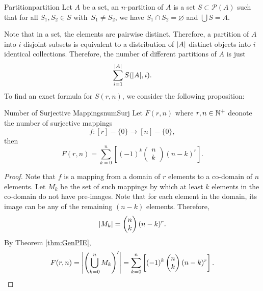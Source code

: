 \documentclass[math]{amznotes}
\theoremstyle{remark}
\begin{document}
\begin{dfnbox}{Partition}{partition}
    Let $A$ be a set, an $n$-partition of $A$ is a set $S \subset \mathcal{P}(A)$ such that for all $S_1, S_2 \in S$ with~$S_1 \neq S_2$, we have $S_1 \cap S_2 = \varnothing$ and $\bigcup S = A$.
\end{dfnbox}
Note that in a set, the elements are pairwise distinct. Therefore, a partition of $A$ into $i$ disjoint subsets is equivalent to a distribution of ${\left\lvert {A} \right\rvert}$ distinct objects into $i$ identical collections. Therefore, the number of different partitions of $A$ is just
\begin{equation*}
    \sum_{i = 1}^{{\left\lvert {A} \right\rvert}}S({\left\lvert {A} \right\rvert}, i).
\end{equation*}
To find an exact formula for $S(r, n)$, we consider the following proposition:
\begin{probox}{Number of Surjective Mappings}{numSurj}
    Let $F(r, n)$ where $r, n \in \mathbb{N}^+$ deonote the number of surjective mappings
    \begin{equation*}
        f \colon [r] - \{0\} \to [n] - \{0\},
    \end{equation*}
    then
    \begin{equation*}
        F(r, n) = \sum_{k = 0}^{n}\left[(-1)^k \begin{pmatrix}
            n \\
            k
        \end{pmatrix}(n - k)^r\right].
    \end{equation*}
    \tcblower
    \begin{proof}
        Note that $f$ is a mapping from a domain of $r$ elements to a co-domain of $n$ elements. Let $M_k$ be the set of such mappings by which at least $k$ elements in the co-domain do not have pre-images. Note that for each element in the domain, its image can be any of the remaining $(n - k)$ elements. Therefore, 
        \begin{equation*}
            {\left\lvert {M_k} \right\rvert} = \begin{pmatrix}
                n \\
                k
            \end{pmatrix}(n - k)^r.
        \end{equation*}
        By Theorem \ref{thm:GenPIE}, 
        \begin{equation*}
            F(r, n) = {\left\lvert {\left(\bigcup_{k = 0}^nM_k\right)'} \right\rvert} = \sum_{k = 0}^{n}\left[(-1)^k \begin{pmatrix}
                n \\
                k
            \end{pmatrix}(n - k)^r\right].
        \end{equation*}
    \end{proof}
\end{probox}
\end{document}
